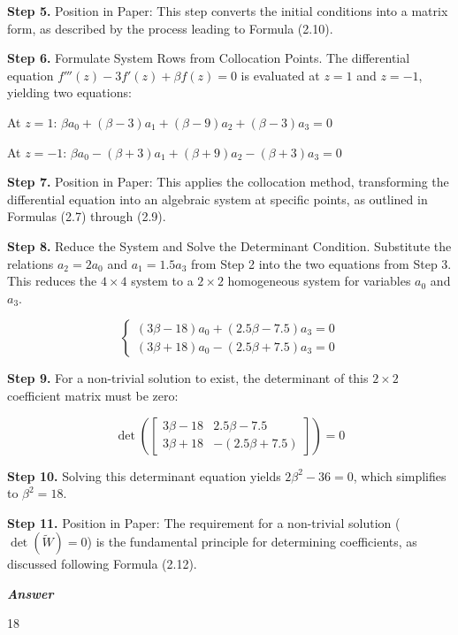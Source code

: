 \begin{tcolorbox}[
    breakable,
    title=Example of Scientific Deep Research in Math,
    colback=LighterGray,
    colframe=DeepPurple,
    colbacktitle=DeepPurple,
    coltitle=White,
]
\textbf{\textcolor{CaseOrange}{Step 5.}} Position in Paper: This step converts the initial conditions into a matrix form, as described by the process leading to Formula (2.10).

\textbf{\textcolor{CaseOrange}{Step 6.}} Formulate System Rows from Collocation Points. The differential equation $f'''(z) - 3f'(z) + \beta f(z) = 0$ is evaluated at $z=1$ and $z=-1$, yielding two equations:

At $z=1$: $\beta a_0 + (\beta-3)a_1 + (\beta-9)a_2 + (\beta-3)a_3 = 0$

At $z=-1$: $\beta a_0 - (\beta+3)a_1 + (\beta+9)a_2 - (\beta+3)a_3 = 0$

\textbf{\textcolor{CaseOrange}{Step 7.}} Position in Paper: This applies the collocation method, transforming the differential equation into an algebraic system at specific points, as outlined in Formulas (2.7) through (2.9).

\textbf{\textcolor{CaseOrange}{Step 8.}} Reduce the System and Solve the Determinant Condition. Substitute the relations $a_2 = 2a_0$ and $a_1 = 1.5a_3$ from Step 2 into the two equations from Step 3. This reduces the $4\times4$ system to a $2\times2$ homogeneous system for variables $a_0$ and $a_3$.

\[
\left\{
\begin{aligned}
(3\beta - 18)a_0 + (2.5\beta - 7.5)a_3 = 0 \\
(3\beta + 18)a_0 - (2.5\beta + 7.5)a_3 = 0
\end{aligned}
\right.
\]

\textbf{\textcolor{CaseOrange}{Step 9.}} For a non-trivial solution to exist, the determinant of this $2\times2$ coefficient matrix must be zero:

\[
\det\left(
\begin{bmatrix}
3\beta - 18 & 2.5\beta - 7.5 \\
3\beta + 18 & -(2.5\beta + 7.5)
\end{bmatrix}
\right) = 0
\]

\textbf{\textcolor{CaseOrange}{Step 10.}} Solving this determinant equation yields $2\beta^2 - 36 = 0$, which simplifies to $\beta^2 = 18$.

\textbf{\textcolor{CaseOrange}{Step 11.}} Position in Paper: The requirement for a non-trivial solution ($\det(\widetilde{W})=0$) is the fundamental principle for determining coefficients, as discussed following Formula (2.12).

\textbf{\emph{\textcolor{DeepPurple}{Answer}}}

18

\end{tcolorbox}
